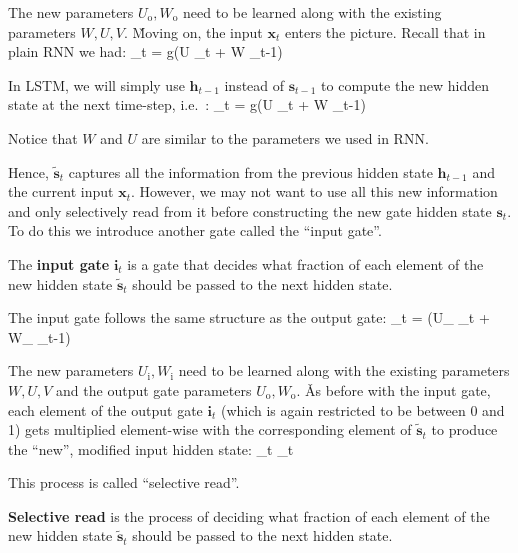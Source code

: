 The new parameters $U_{\text{o}}, W_{\text{o}}$ need to be learned along with the existing parameters $W, U, V$. \v

Moving on, the input $\boldsymbol{x}_{t}$ enters the picture. Recall that in plain RNN we had:
\bse
{}_{t} = g(U _t + W _{t-1})
\ese

In LSTM, we will simply use $\boldsymbol{h}_{t-1}$ instead of $\boldsymbol{s}_{t-1}$ to compute the new hidden state at
the
next time-step, i.e.\ :
\bse
{}_t = g(U _t + W _{t-1})
\ese

Notice that $W$ and $U$ are similar to the parameters we used in RNN\@.


Hence, $\boldsymbol{\tilde{s}}_t$ captures all the information from the previous hidden state $\boldsymbol{h}_{t-1}$ and
the
current input $\boldsymbol{x}_t $. However, we may not want to use all this new information and only selectively read
from it before constructing the new gate hidden state $\boldsymbol{s}_t$. To do this we introduce another gate called
the
``input gate''.

The \textbf{input gate} $\boldsymbol{i}_{t}$ is a gate that decides what fraction of each element of the new hidden
state
$\boldsymbol{\tilde{s}}_t$ should be passed to the next hidden state.
\ed

The input gate follows the same structure as the output gate:
\bse
{}_{t} = \sigma(U_{} _{t} + W_{} _{t-1})
\ese

The new parameters $U_{\text{i}}, W_{\text{i}}$ need to be learned along with the existing parameters
$W, U, V$ and the output gate parameters $U_{\text{o}}, W_{\text{o}}$. \v

As before with the input gate, each element of the output gate $\boldsymbol{i}_{t}$ (which is again restricted to be
between 0 and 1) gets multiplied element-wise with the corresponding element of $\boldsymbol{\tilde{s}}_t$ to produce
the ``new'', modified input hidden state:
\bse
{}_t \odot {}_{t}
\ese

This process is called ``selective read''.

\textbf{Selective read} is the process of deciding what fraction of each element of the new hidden state
$\boldsymbol{\tilde{s}}_t$ should be passed to the next hidden state.
\ed

